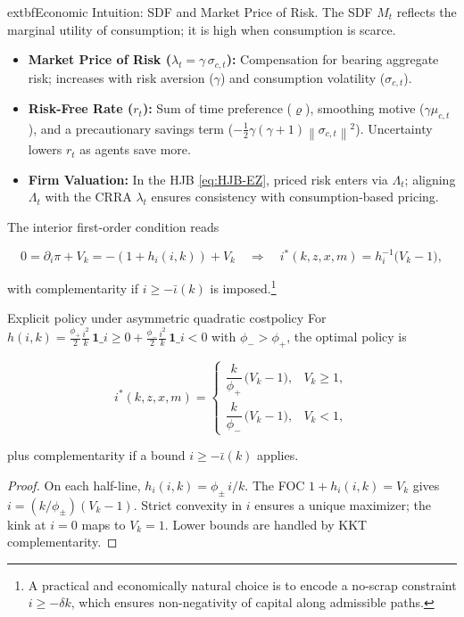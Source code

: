 \documentclass[11pt,letterpaper,oneside]{article}
\numberwithin{equation}{section}
\newcommand{\1}{\mathbf{1}}
\newcommand{\ind}[1]{\mathbf{1}\_{{#1}}}
\newcommand{\kbar}{\bar\iota}
\newcommand{\norm}[1]{\left\lVert #1\right\rVert}
\begin{document}
\begin{tcolorbox}[didacticstyle]
  extbf{Economic Intuition: SDF and Market Price of Risk.}
The SDF $M_t$ reflects the marginal utility of consumption; it is high when consumption is scarce.\
\begin{itemize}[leftmargin=1.15em,itemsep=0.25em]
 \item \textbf{Market Price of Risk ($\lambda_t = \gamma \, \sigma_{c,t}$):} Compensation for bearing aggregate risk; increases with risk aversion ($\gamma$) and consumption volatility ($\sigma_{c,t}$).
 \item \textbf{Risk-Free Rate ($r_t$):} Sum of time preference ($\varrho$), smoothing motive ($\gamma\mu_{c,t}$), and a precautionary savings term ($-\tfrac12\gamma(\gamma+1)\norm{\sigma_{c,t}}^2$). Uncertainty lowers $r_t$ as agents save more.
 \item \textbf{Firm Valuation:} In the HJB \eqref{eq:HJB-EZ}, priced risk enters via $\Lambda_t$; aligning $\Lambda_t$ with the CRRA $\lambda_t$ ensures consistency with consumption-based pricing.
\end{itemize}
\end{tcolorbox}

The interior first-order condition reads

$$
0=\partial_i\pi+V_k=-(1+h_i(i,k))+V_k
\quad\Longrightarrow\quad
i^*(k,z,x,m)=h_i^{-1}\!\big(V_k-1\big),
$$

with complementarity if $i\ge -\kbar(k)$ is imposed.\footnote{A practical and economically natural choice is to encode a no-scrap constraint $i\ge -\delta k$, which ensures non-negativity of capital along admissible paths.}

\begin{proposition}{Explicit policy under asymmetric quadratic cost}{policy}
For
$h(i,k)=\tfrac{\phi_+}{2}\tfrac{i^2}{k}\,\ind{i\ge 0}
+\tfrac{\phi_-}{2}\tfrac{i^2}{k}\,\ind{i<0}$
with $\phi_->\phi_+$, the optimal policy is

$$
i^*(k,z,x,m)=
\begin{cases}
\dfrac{k}{\phi_+}\,\big(V_k-1\big), & V_k\ge 1,\\[6pt]
\dfrac{k}{\phi_-}\,\big(V_k-1\big), & V_k< 1,
\end{cases}
$$

plus complementarity if a bound $i\ge -\kbar(k)$ applies.
\end{proposition}
\begin{proof}
On each half-line, $h_i(i,k)=\phi_\pm\,i/k$. The FOC $1+h_i(i,k)=V_k$ gives $i=(k/\phi_\pm)(V_k-1)$. Strict convexity in $i$ ensures a unique maximizer; the kink at $i=0$ maps to $V_k=1$. Lower bounds are handled by KKT complementarity.
\end{proof}
\end{document}
